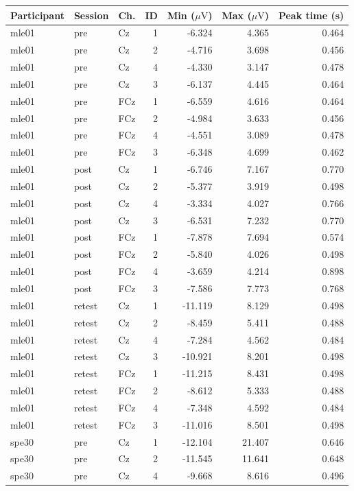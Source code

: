 \documentclass[11pt,a4paper]{article}
\newcommand{\uv}{\ensuremath{\mu\mathrm{V}}}
\begin{document}
\small\begin{longtable}{lllrrrr}\toprule Participant & Session & Ch. & ID & Min (\uv) & Max (\uv) & Peak time (s)\\\midrule\endhead
mle01 & pre & Cz & 1 & -6.324 & 4.365 & 0.464 \\
mle01 & pre & Cz & 2 & -4.716 & 3.698 & 0.456 \\
mle01 & pre & Cz & 4 & -4.330 & 3.147 & 0.478 \\
mle01 & pre & Cz & 3 & -6.137 & 4.445 & 0.464 \\
mle01 & pre & FCz & 1 & -6.559 & 4.616 & 0.464 \\
mle01 & pre & FCz & 2 & -4.984 & 3.633 & 0.456 \\
mle01 & pre & FCz & 4 & -4.551 & 3.089 & 0.478 \\
mle01 & pre & FCz & 3 & -6.348 & 4.699 & 0.462 \\
mle01 & post & Cz & 1 & -6.746 & 7.167 & 0.770 \\
mle01 & post & Cz & 2 & -5.377 & 3.919 & 0.498 \\
mle01 & post & Cz & 4 & -3.334 & 4.027 & 0.766 \\
mle01 & post & Cz & 3 & -6.531 & 7.232 & 0.770 \\
mle01 & post & FCz & 1 & -7.878 & 7.694 & 0.574 \\
mle01 & post & FCz & 2 & -5.840 & 4.026 & 0.498 \\
mle01 & post & FCz & 4 & -3.659 & 4.214 & 0.898 \\
mle01 & post & FCz & 3 & -7.586 & 7.773 & 0.768 \\
mle01 & retest & Cz & 1 & -11.119 & 8.129 & 0.498 \\
mle01 & retest & Cz & 2 & -8.459 & 5.411 & 0.488 \\
mle01 & retest & Cz & 4 & -7.284 & 4.562 & 0.484 \\
mle01 & retest & Cz & 3 & -10.921 & 8.201 & 0.498 \\
mle01 & retest & FCz & 1 & -11.215 & 8.431 & 0.498 \\
mle01 & retest & FCz & 2 & -8.612 & 5.333 & 0.488 \\
mle01 & retest & FCz & 4 & -7.348 & 4.592 & 0.484 \\
mle01 & retest & FCz & 3 & -11.016 & 8.501 & 0.498 \\
spe30 & pre & Cz & 1 & -12.104 & 21.407 & 0.646 \\
spe30 & pre & Cz & 2 & -11.545 & 11.641 & 0.648 \\
spe30 & pre & Cz & 4 & -9.668 & 8.616 & 0.496 \\

\end{longtable}
\end{document}
